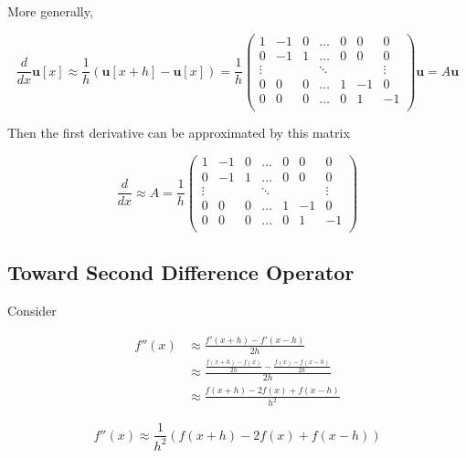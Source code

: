 \documentclass[12pt,]{book}
\begin{document}
More generally,

\begin{equation}\frac{d}{dx}\mathbf{u}[x] \approx \frac{1}{h}\left(\mathbf{u}[x+h]-\mathbf{u}[x]\right)=
\frac{1}{h}\left(
\begin{matrix}
1 & -1 &  0 & \dots & 0 & 0 & 0 \\
0 & -1 & 1 & \dots &  0 & 0 & 0 \\
\vdots & \ & \ & \ddots & \ & \ & \vdots \\
0 & 0 & 0 & \dots & 1 & -1 & 0 \\
0 & 0 & 0 & \dots & 0 & 1 & -1 \\
\end{matrix}\right)\mathbf{u}=A \mathbf{u}
\label{eq:first_difference_equation}\end{equation}

Then the first derivative can be approximated by this matrix

\begin{equation}\frac{d}{dx} \approx A = 
\frac{1}{h}\left(\begin{matrix}
1 & -1 &  0 & \dots & 0 & 0 & 0 \\
0 & -1 & 1 & \dots &  0 & 0 & 0 \\
\vdots & \ & \ & \ddots & \ & \ & \vdots \\
0 & 0 & 0 & \dots & 1 & -1 & 0 \\
0 & 0 & 0 & \dots & 0 & 1 & -1 \\
\end{matrix}\right)
\label{eq:first_difference_operator}\end{equation}

\pagebreak

\subsection{Toward Second Difference
Operator}\label{toward-second-difference-operator}

Consider

\begin{align*}
f''(x) &\approx \frac{f'(x+h)-f'(x-h)}{2h}\\
&\approx \frac{\frac{f(x+h)-f(x)}{2h}-\frac{f(x)-f(x-h)}{2h}}{2h}\\
&\approx \frac{f(x+h) - 2f(x) + f(x-h)}{h^2}\tag{with $2h$ recast as $h$}
\end{align*}

\begin{equation}f''(x)\approx \frac{1}{h^2}\left(f(x+h) - 2f(x) + f(x-h)\right)\label{eq:second_difference}\end{equation}
\end{document}
